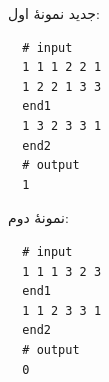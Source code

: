  ‌جدید
  نمونۀ اول:
  
  \begin{latin}
  \begin{lstlisting}
  # input
  1 1 1 2 2 1
  1 2 2 1 3 3
  end1
  1 3 2 3 3 1
  end2
  # output
  1
  \end{lstlisting}
  \end{latin}
 نمونۀ دوم:

%
  \begin{latin}
  \begin{lstlisting}
  # input
  1 1 1 3 2 3
  end1
  1 1 2 3 3 1
  end2
  # output
  0
  \end{lstlisting}
  \end{latin}



% 
%
%
% 




